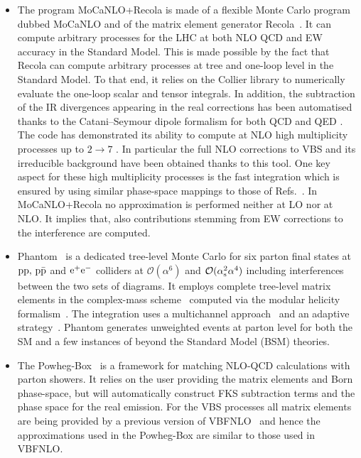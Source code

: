 \begin{itemize}
\item The program {\sc MoCaNLO+Recola} is made of a flexible Monte Carlo program dubbed {\sc MoCaNLO} and of the matrix element generator {\sc Recola}~\cite{Actis:2012qn,Actis:2016mpe}.
It can compute arbitrary processes for the LHC at both NLO QCD and EW accuracy in the Standard Model.
This is made possible by the fact that {\sc Recola} can compute arbitrary processes at tree and one-loop level in the Standard Model.
To that end, it relies on the {\sc Collier} library \cite{Denner:2014gla,Denner:2016kdg} to numerically evaluate the one-loop scalar and tensor integrals.
In addition, the subtraction of the IR divergences appearing in the real corrections has been automatised thanks to the Catani--Seymour dipole formalism for both QCD and QED \cite{Catani:1996vz,Dittmaier:1999mb}.
The code has demonstrated its ability to compute at NLO high multiplicity processes up to $2 \to 7$ \cite{Denner:2015yca,Denner:2016wet}.
In particular the full NLO corrections to VBS and its irreducible background \cite{Biedermann:2016yds,Biedermann:2017bss} have been obtained thanks to this tool.
One key aspect for these high multiplicity processes is the fast integration which is ensured by using similar phase-space mappings to those of Refs.~\cite{Berends:1994pv,Denner:1999gp,Dittmaier:2002ap}. 
In {\sc MoCaNLO+Recola} no approximation is performed neither at LO nor at NLO.
It implies that, also contributions stemming from EW corrections to the interference are computed.
        
  \item {\sc Phantom}~\cite{Ballestrero:2007xq} is a dedicated tree-level Monte Carlo for six parton final states 
  at $\text{p} \text{p},\, \text{p}\bar{\text{p}}$ and $\text{e}^+\text{e}^-$ colliders at  $\mathcal O(\alpha^6)$ and $\mathcal O(\alpha_\text{s}^2\alpha^4)$ including interferences between the two sets of diagrams.
It employs complete tree-level matrix elements in the complex-mass scheme~\cite{Denner:1999gp,Denner:2005fg,Denner:2006ic} computed via the modular helicity formalism~\cite{Ballestrero:1999md,Ballestrero:1994jn}.
The integration uses a multichannel approach~\cite{Berends:1984gf} and an adaptive strategy~\cite{Lepage:1977sw}.
{\sc Phantom} generates unweighted events at parton level for both the SM and a few instances of beyond the Standard Model (BSM) theories.

  \item The {\sc Powheg-Box}~\cite{Alioli:2010xd,Frixione:2007vw,Nason:2006hfa} is a framework for matching NLO-QCD calculations with parton showers.
It relies on the user providing the matrix elements and Born phase-space, but will automatically construct FKS \cite{Frixione:1995ms} subtraction terms and the phase space for the real emission.
For the VBS processes all matrix elements are being provided by a previous version of {\sc VBFNLO}~\cite{Arnold:2008rz, Arnold:2011wj, Baglio:2014uba} and hence the approximations used in the {\sc Powheg-Box} are similar to those used in {\sc VBFNLO}.


\end{itemize}
